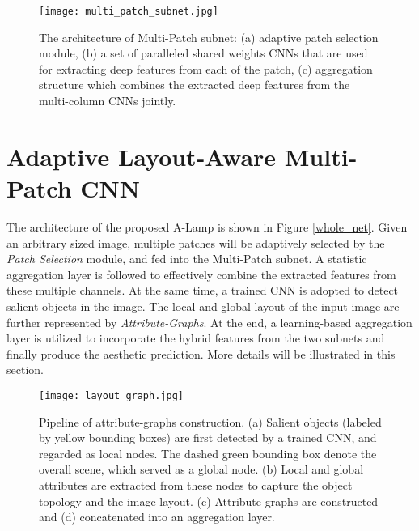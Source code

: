 \documentclass[10pt,twocolumn,letterpaper]{article}
\begin{document}
	\begin{figure}
		\centering
		\texttt{[image: multi\_patch\_subnet.jpg]}
		\caption{The architecture of Multi-Patch subnet: (a) adaptive patch selection module, (b) a set of paralleled shared weights CNNs that are used for extracting deep features from each of the patch, (c) aggregation structure which combines the extracted deep features from the multi-column CNNs jointly.}
		\label{multi_patch}
		\vspace{-3mm}
	\end{figure} 
	\section{Adaptive Layout-Aware Multi-Patch CNN}
	The architecture of the proposed A-Lamp is shown in Figure \ref{whole_net}. Given an arbitrary sized image, multiple patches will be adaptively selected by the \textit{Patch Selection} module, and fed into the Multi-Patch subnet. A statistic aggregation layer is followed to effectively combine the extracted features from these multiple channels.
	At the same time, a trained CNN is adopted to detect salient objects in the image. The local and global layout of the input image are further represented by \textit{Attribute-Graphs}. At the end, a learning-based aggregation layer is utilized to incorporate the hybrid features from the two subnets and finally produce the aesthetic prediction. More details will be illustrated in this section. 
	\begin{figure*}
		\centering
		\texttt{[image: layout\_graph.jpg]}
		\caption{Pipeline of attribute-graphs construction. (a) Salient objects (labeled by yellow bounding boxes) are first detected by a trained CNN, and regarded as local nodes. The dashed green bounding box denote the overall scene, which served as a global node. (b) Local and global attributes are extracted from these nodes to capture the object topology and the image layout. (c) Attribute-graphs are constructed and (d) concatenated into an aggregation layer.}
		\label{layout}
		\vspace{-3mm}
	\end{figure*}
	
\end{document}

